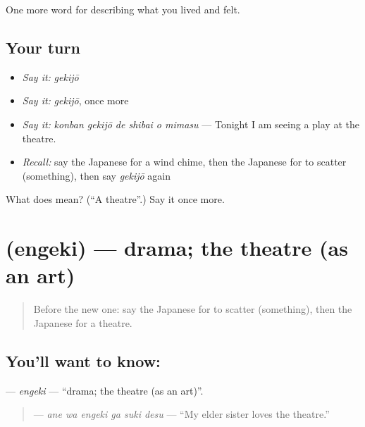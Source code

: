 \begin{grammarlens}[title={What you've built}]
One more word for describing what you lived and felt.
\end{grammarlens}

\subsection*{Your turn}
\begin{itemize}
\raggedright
  \item \emph{Say it:} \emph{gekijō}
  \item \emph{Say it:} \emph{gekijō}, once more
  \item \emph{Say it:} \emph{konban gekijō de shibai o mimasu} — Tonight I am seeing a play at the theatre.
  \item \emph{Recall:} say the Japanese for a wind chime, then the Japanese for to scatter (something), then say \emph{gekijō} again
\end{itemize}

\begin{tcolorbox}[breakable,colback=teal!4,colframe=teal!35!black,title={Before you move on}]
What does  mean? (\textquotedblleft{}A theatre\textquotedblright{}.) Say it once more.
\end{tcolorbox}
\section[\texorpdfstring{\ja{えんげき} (engeki)}{えんげき (engeki)}]{ (engeki) — drama; the theatre (as an art)}

\label{lesson:JA-C502-engeki}



\begin{quote}
Before the new one: say the Japanese for to scatter (something), then the Japanese for a theatre.
\end{quote}

\subsection*{You'll want to know: }
\textbf{} — \emph{engeki} — \textquotedblleft{}drama; the theatre (as an art)\textquotedblright{}.

\begin{quote}
\textbf{  } — \emph{ane wa engeki ga suki desu} — \textquotedblleft{}My elder sister loves the theatre.\textquotedblright{}
\end{quote}

